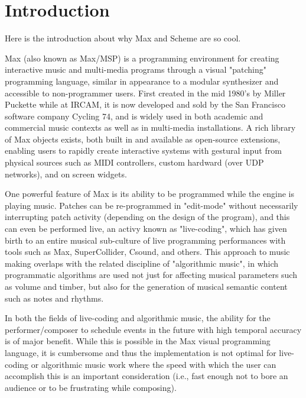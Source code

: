 \documentclass[acmsmall]{acmart}
\begin{document}
\maketitle

\section{Introduction}
Here is the introduction about why Max and Scheme are so cool.

Max (also known as Max/MSP) is a programming environment for
creating interactive music and multi-media programs through
a visual "patching" programming language, 
similar in appearance to a modular synthesizer
and accessible to non-programmer users. 
First created in the mid 1980's by Miller Puckette while at IRCAM,
it is now developed and sold by the San Francisco software company Cycling 74,
and is widely used in both academic and commercial music contexts as well
as in multi-media installations. %
A rich library of Max objects exists, both built in and available as open-source 
extensions, enabling users to rapidly create interactive systems with gestural 
input from physical sources such as MIDI controllers, custom hardward 
(over UDP networks), and on screen widgets. 


One powerful feature of Max is its ability to be programmed
while the engine is playing music. Patches can be re-programmed in "edit-mode"
without necessarily interrupting patch activity (depending on the design
of the program), and this can
even be performed live, an activy known as "live-coding", which has given
birth to an entire musical sub-culture of live programming performances
with tools such as Max, SuperCollider, Csound, and others. 
This approach to music making overlaps with the related discipline of 
"algorithmic music", in which programmatic algorithms are used
not just for affecting musical parameters such as volume and timber, 
but also for the generation of musical semantic content such as notes
and rhythms.

In both the fields of live-coding and algorithmic music, the ability for
the performer/composer to schedule events in the future with high temporal
accuracy is of major benefit. While this is possible in the Max visual
programming language, it is cumbersome and thus the implementation is not
optimal for live-coding or algorithmic music work where the speed with which
the user can accomplish this is an important consideration (i.e., fast
enough not to bore an audience or to be frustrating while composing).
\end{document}
